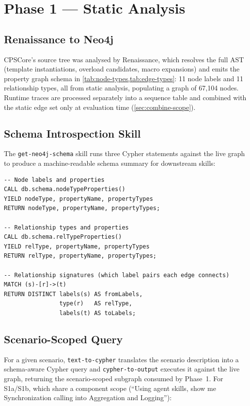 \section{Phase 1 --- Static Analysis}\label{sec:static-impl}

\subsection{Renaissance to Neo4j}

CPSCore's source tree was analysed by Renaissance, which resolves the
full \ac{AST} (template instantiations, overload candidates, macro
expansions) and emits the property graph schema in
\cref{tab:node-types,tab:edge-types}: 11 node labels and 11 relationship
types, all from static analysis, populating a graph of 67,104 nodes.
Runtime traces are processed separately into a sequence table and
combined with the static edge set only at evaluation time
(\cref{sec:combine-scope}).

\subsection{Schema Introspection Skill}

The \texttt{get-neo4j-schema} skill runs three Cypher statements against
the live graph to produce a machine-readable schema summary for
downstream skills:

\begin{verbatim}
-- Node labels and properties
CALL db.schema.nodeTypeProperties()
YIELD nodeType, propertyName, propertyTypes
RETURN nodeType, propertyName, propertyTypes;

-- Relationship types and properties
CALL db.schema.relTypeProperties()
YIELD relType, propertyName, propertyTypes
RETURN relType, propertyName, propertyTypes;

-- Relationship signatures (which label pairs each edge connects)
MATCH (s)-[r]->(t)
RETURN DISTINCT labels(s) AS fromLabels,
                type(r)   AS relType,
                labels(t) AS toLabels;
\end{verbatim}

\subsection{Scenario-Scoped Query}\label{sec:scenario-query-impl}

For a given scenario, \texttt{text-to-cypher} translates the scenario
description into a schema-aware Cypher query and \texttt{cypher-to-output}
executes it against the live graph, returning the scenario-scoped
subgraph consumed by Phase~1. For S1a/S1b, which share a component scope
(``Using agent skills, show me Synchronization calling into Aggregation
and Logging''):


